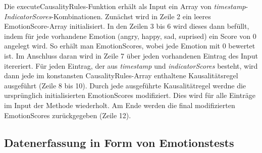 Die executeCausalityRules-Funktion erhält als Input ein Array von \textit{timestamp}-\textit{IndicatorScores}-Kombinationen. Zunächst wird in Zeile 2 ein leeres EmotionScore-Array initialisiert. In den Zeilen 3 bis 6 wird dieses dann befüllt, indem für jede vorhandene Emotion (angry, happy, sad, suprised) ein Score von 0 angelegt wird. So erhält man EmotionScores, wobei jede Emotion mit 0 bewertet ist. \newline
Im Anschluss daran wird in Zeile 7 über jeden vorhandenen Eintrag des Input itereriert. Für jeden Eintrag, der aus \textit{timestamp} und \textit{indicatorScores} besteht, wird dann jede im konstansten CausalityRules-Array enthaltene Kausalitätsregel ausgeführt (Zeile 8 bis 10). Durch jede ausgeführte Kausalitätregel werdne die ursprünglich initialisierten EmotionScores modifiziert. Dies wird für alle Einträge im Input der Methode wiederholt. Am Ende werden die final modifizierten EmotionScores zurückgegeben (Zeile 12). 
\subsection{Datenerfassung in Form von Emotionstests}

